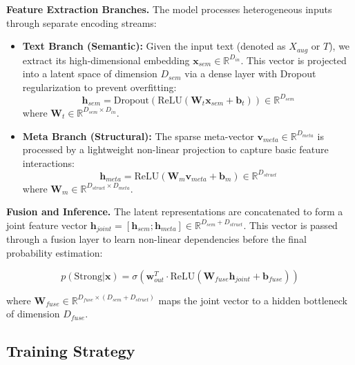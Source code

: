 \documentclass{article}
\theoremstyle{plain}
\theoremstyle{definition}
\theoremstyle{remark}
\begin{document}
\textbf{Feature Extraction Branches.}
The model processes heterogeneous inputs through separate encoding streams:
\begin{itemize}
    \item \textbf{Text Branch (Semantic):} Given the input text (denoted as $X_{aug}$ or $T$), we extract its high-dimensional embedding $\mathbf{x}_{sem} \in \mathbb{R}^{D_{in}}$. This vector is projected into a latent space of dimension $D_{sem}$ via a dense layer with Dropout regularization to prevent overfitting:
    \begin{equation}
    \mathbf{h}_{sem} = \text{Dropout}(\text{ReLU}(\mathbf{W}_t \mathbf{x}_{sem} + \mathbf{b}_t)) \in \mathbb{R}^{D_{sem}}
    \end{equation}
    where $\mathbf{W}_t \in \mathbb{R}^{D_{sem} \times D_{in}}$.
    
    \item \textbf{Meta Branch (Structural):} The sparse meta-vector $\mathbf{v}_{meta} \in \mathbb{R}^{D_{meta}}$ is processed by a lightweight non-linear projection to capture basic feature interactions:
    \begin{equation}
    \mathbf{h}_{meta} = \text{ReLU}(\mathbf{W}_m \mathbf{v}_{meta} + \mathbf{b}_m) \in \mathbb{R}^{D_{struct}}
    \end{equation}
    where $\mathbf{W}_m \in \mathbb{R}^{D_{struct} \times D_{meta}}$.
\end{itemize}

\textbf{Fusion and Inference.}
The latent representations are concatenated to form a joint feature vector $\mathbf{h}_{joint} = [\mathbf{h}_{sem}; \mathbf{h}_{meta}] \in \mathbb{R}^{D_{sem} + D_{struct}}$. This vector is passed through a fusion layer to learn non-linear dependencies before the final probability estimation:

\begin{equation}
p(\text{Strong}|\mathbf{x}) = \sigma \left( \mathbf{w}_{out}^T \cdot \text{ReLU}(\mathbf{W}_{fuse} \mathbf{h}_{joint} + \mathbf{b}_{fuse}) \right)
\end{equation}

where $\mathbf{W}_{fuse} \in \mathbb{R}^{D_{fuse} \times (D_{sem} + D_{struct})}$ maps the joint vector to a hidden bottleneck of dimension $D_{fuse}$.


\subsection{Training Strategy}
\end{document}
